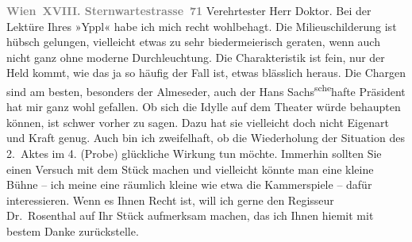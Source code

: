 \begin{ledgroupsized}[t]{13cm}
           \pstart
           \textcolor{gray}{\textbf{Wien XVIII. Sternwartestrasse 71}}\pend
           \pstart\center{}Verehrtester Herr Doktor.\pend\pstart
           Bei der Lektüre Ihres »Yppl« habe ich mich recht
               wohlbehagt. Die Milieuschilderung ist hübsch gelungen, vielleicht etwas zu sehr
               biedermeierisch geraten, wenn auch nicht ganz ohne moderne Durchleuchtung. Die
               Charakteristik ist fein, nur der Held kommt, wie das ja so häufig der Fall ist, etwas
               blässlich heraus. Die Chargen sind am besten, besonders der Almeseder, auch der Hans Sachs\substVorne{}\textsuperscript{sche}\substDazwischen{}hafte\substHinten{} Präsident hat mir ganz wohl gefallen.\pend
           \pstart
           Ob sich die Idylle auf dem Theater würde behaupten können, ist schwer vorher zu
               sagen. Dazu hat sie vielleicht doch nicht Eigenart und Kraft genug. Auch bin ich
               zweifelhaft, ob die Wiederholung der Situation des 2. Aktes im 4. (Probe) glückliche
               Wirkung tun möchte. Immerhin sollten Sie einen Versuch mit dem {\pb}Stück machen und vielleicht
               könnte man eine kleine Bühne – ich meine eine räumlich kleine wie etwa die Kammerspiele – dafür interessieren. Wenn es Ihnen
               Recht ist, will ich gerne den Regisseur Dr. Rosenthal auf Ihr Stück aufmerksam machen, das ich Ihnen hiemit mit bestem Danke zurückstelle.

\end{ledgroupsized}
